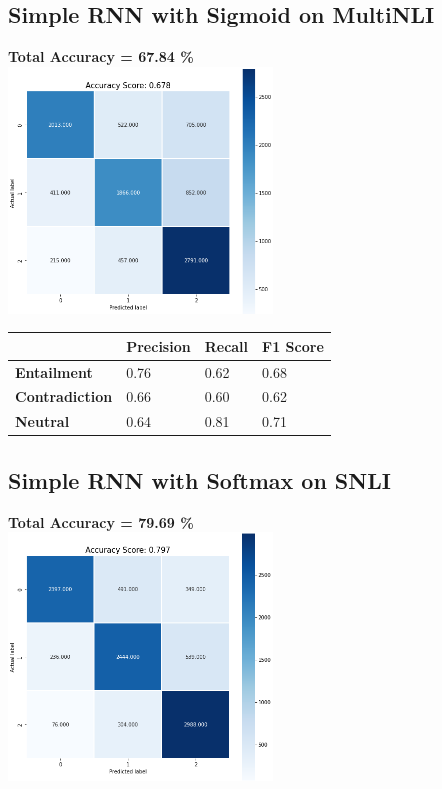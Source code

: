 \documentclass[12pt, conference]{IEEEtran}
\begin{document}
\subsection{Simple RNN with Sigmoid on MultiNLI}
\textbf{Total Accuracy = 67.84 \%}\\
\includegraphics[width=7cm]{images/results/MNLIsigmoid.png}

\begin{table}[h]
\begin{tabular}{|l|l|l|l|}
\hline
                       & \textbf{Precision} & \textbf{Recall} & \textbf{F1 Score} \\ \hline
\textbf{Entailment}    & 0.76               & 0.62            & 0.68              \\ \hline
\textbf{Contradiction} & 0.66               & 0.60            & 0.62              \\ \hline
\textbf{Neutral}       & 0.64               & 0.81            & 0.71              \\ \hline
\end{tabular}
\end{table}

\subsection{Simple RNN with Softmax on SNLI}
\textbf{Total Accuracy = 79.69 \%}\\
\includegraphics[width=7cm]{images/results/SNLIsoft.png}
\end{document}
